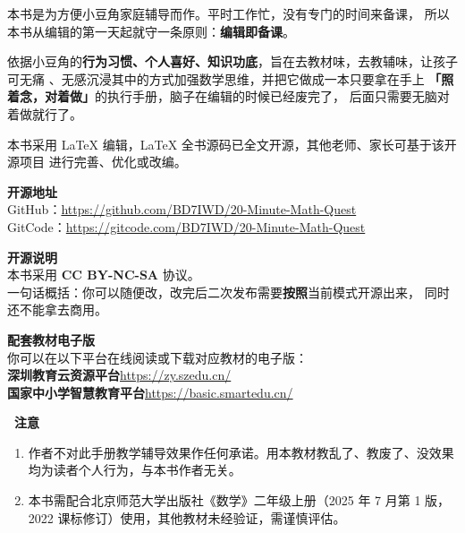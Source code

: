 
本书是为方便小豆角家庭辅导而作。平时工作忙，没有专门的时间来备课，
所以本书从编辑的第一天起就守一条原则：\textbf{编辑即备课}。

依据小豆角的\textbf{行为习惯、个人喜好、知识功底}，旨在去教材味，去教辅味，让孩子可无痛
、无感沉浸其中的方式加强数学思维，并把它做成一本只要拿在手上
\textbf{「照着念，对着做」}的执行手册，脑子在编辑的时候已经废完了，
后面只需要无脑对着做就行了。


\vspace{8pt}
本书采用 \LaTeX{} 编辑，\LaTeX{} 全书源码已全文开源，其他老师、家长可基于该开源项目
进行完善、优化或改编。

\vspace{4pt}

\begin{tipbox}\small
\textbf{开源地址}\\[4pt]
GitHub：\url{https://github.com/BD7IWD/20-Minute-Math-Quest}\\[3pt]
GitCode：\url{https://gitcode.com/BD7IWD/20-Minute-Math-Quest}

\vspace{6pt}
\textbf{开源说明}\\[4pt]
本书采用 \textbf{CC BY-NC-SA} 协议。\\
一句话概括：你可以随便改，改完后二次发布需要\textbf{按照}当前模式开源出来，
同时还不能拿去商用。
\end{tipbox}

\vspace{10pt}
\begin{tipbox}\small
\textbf{配套教材电子版}\\[4pt]
你可以在以下平台在线阅读或下载对应教材的电子版：\\[4pt]
\textbf{深圳教育云资源平台}\quad \url{https://zy.szedu.cn/}\\[3pt]
\textbf{国家中小学智慧教育平台}\quad \url{https://basic.smartedu.cn/}
\end{tipbox}

\vspace{10pt}
\begin{warnbox}
\textbf{\ 注意}
\begin{enumerate}[label=\arabic*.,leftmargin=1.6em,itemsep=2pt,topsep=4pt]
  \item 作者不对此手册教学辅导效果作任何承诺。用本教材教乱了、教废了、没效果均为读者个人行为，与本书作者无关。
  \item 本书需配合北京师范大学出版社《数学》二年级上册（2025 年 7 月第 1 版，2022 课标修订）使用，其他教材未经验证，需谨慎评估。
\end{enumerate}
\end{warnbox}
